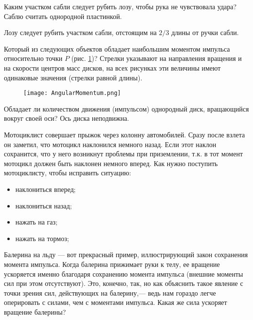 \begin{ex}  %
Каким участком сабли следует рубить лозу, чтобы рука не чувствовала удара? Саблю считать однородной пластинкой.
\begin{ans}
Лозу следует рубить участком сабли, отстоящим на $2/3$ длины от ручки сабли.
\end{ans}
\end{ex}	

\qualProblems

\begin{ex}
Который из следующих объектов обладает наибольшим моментом импульса относительно точки $P$ (рис. \ref{AngularMomentum})? Стрелки указывают на направления вращения и на скорости центров масс дисков, на всех рисунках эти величины имеют одинаковые значения (стрелки равной длины).
\end{ex}	

\begin{figure}[h]
\centering
\texttt{[image: AngularMomentum.png]}
\caption{}
\label{AngularMomentum}
\end{figure}

\begin{ex}
Обладает ли количеством движения (импульсом) однородный диск, вращающийся вокруг своей оси? Ось диска неподвижна.
\end{ex}	

\begin{ex}
Мотоциклист совершает прыжок через колонну автомобилей. Сразу после взлета он заметил, что мотоцикл наклонился немного назад. Если этот наклон сохранится, что у него возникнут проблемы при приземлении, т.к. в тот момент мотоцикл должен быть наклонен немного вперед. Как нужно поступить мотоциклисту, чтобы исправить ситуацию:
\begin{itemize}
\item наклониться вперед;
\item наклониться назад;
\item нажать на газ;
\item нажать на тормоз;
\end{itemize}
\end{ex}	

\begin{ex}
Балерина на льду — вот прекрасный пример, иллюстрирующий закон сохранения момента  импульса. Когда балерина прижимает руки к телу, ее вращение ускоряется именно благодаря сохранению момента импульса (внешние моменты сил при этом отсутствуют). Это, конечно, так, но как объяснить такое явление с точки зрения сил, действующих на балерину,— ведь нам гораздо легче оперировать с силами, чем с моментами импульса. Какая же сила ускоряет вращение балерины?
\end{ex}	


